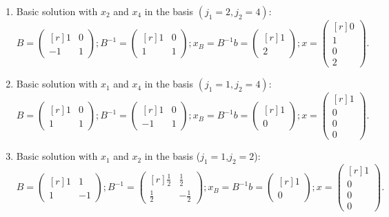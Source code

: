 \begin{enumerate}
\item
Basic solution with $x_2$ and $x_4$ in the basis $(j_1 = 2, j_2 = 4)$:
\begin{equation*}
B = \begin{pmatrix*}[r]
1 & 0\\
-1 & 1
\end{pmatrix*};
B^{-1} = \begin{pmatrix*}[r]
1 & 0\\
1 & 1
\end{pmatrix*};
x_B = B^{-1}b = \begin{pmatrix*}[r]
1 \\
2
\end{pmatrix*};
x = \begin{pmatrix*}[r]
0 \\
1 \\
0 \\
2
\end{pmatrix*}.
\end{equation*}

\item Basic solution with $x_1$ and $x_4$ in the basis $(j_1=1,j_2=4)$:
\[
B
= 
\begin{pmatrix*}[r]
1 & 0\\
1 &1
\end{pmatrix*}
;
B^{-1}
=
\begin{pmatrix*}[r]
1 & 0\\
-1 & 1
\end{pmatrix*}
;
x_B=B^{-1}b
=
\begin{pmatrix*}[r]
1 \\
0
\end{pmatrix*}
;
x
=
\begin{pmatrix*}[r]
1 \\
0 \\
0 \\
0
\end{pmatrix*}.
\]

\item Basic solution with $x_1$ and $x_2$ in the basis ($j_1=1$,$j_2=2$):
\[
B
= 
\begin{pmatrix*}[r]
1 & 1\\
1 &-1
\end{pmatrix*}
;
B^{-1}
=
\begin{pmatrix*}[r]
\frac{1}{2} & \frac{1}{2}\\
\frac{1}{2} &-\frac{1}{2}
\end{pmatrix*}
;
x_B=B^{-1}b
=
\begin{pmatrix*}[r]
1 \\
0
\end{pmatrix*}
;
x
=
\begin{pmatrix*}[r]
1 \\
0 \\
0 \\
0
\end{pmatrix*}.
\]

\end{enumerate}
